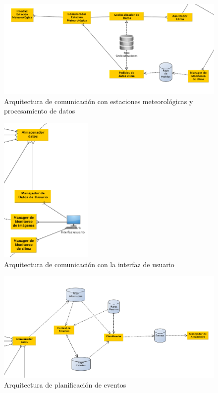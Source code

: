 \begin{figure}[h!]
  \centering
  \includegraphics[width=1\textwidth]{./images/arq_clima.png}
  \caption{Arquitectura de comunicaci\'on con estaciones meteorol\'ogicas y procesamiento de datos}
  \label{fig:clases4}
\end{figure}

\begin{figure}[h!]
  \centering
  \includegraphics[width=0.4\textwidth]{./images/arq_interfazusuario.png}
  \caption{Arquitectura de comunicaci\'on con la interfaz de usuario}
  \label{fig:clases4}
\end{figure}

\begin{figure}[h!]
  \centering
  \includegraphics[width=1\textwidth]{./images/arq_plan.png}
  \caption{Arquitectura de planificaci\'on de eventos}
  \label{fig:clases4}
\end{figure}